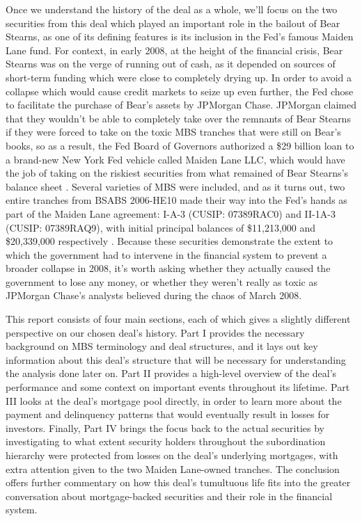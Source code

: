 \documentclass[12pt]{article}
\begin{document}
Once we understand the history of the deal as a whole, we’ll focus on the two securities from this deal which played an important role in the bailout of Bear Stearns, as one of its defining features is its inclusion in the Fed’s famous Maiden Lane fund. For context, in early 2008, at the height of the financial crisis, Bear Stearns was on the verge of running out of cash, as it depended on sources of short-term funding which were close to completely drying up. In order to avoid a collapse which would cause credit markets to seize up even further, the Fed chose to facilitate the purchase of Bear’s assets by JPMorgan Chase. JPMorgan claimed that they wouldn’t be able to completely take over the remnants of Bear Stearns if they were forced to take on the toxic MBS tranches that were still on Bear’s books, so as a result, the Fed Board of Governors authorized a \$29 billion loan to a brand-new New York Fed vehicle called Maiden Lane LLC, which would have the job of taking on the riskiest securities from what remained of Bear Stearns’s balance sheet \parencite{fcic09}. Several varieties of MBS were included, and as it turns out, two entire tranches from BSABS 2006-HE10 made their way into the Fed’s hands as part of the Maiden Lane agreement: I-A-3 (CUSIP: 07389RAC0) and II-1A-3 (CUSIP: 07389RAQ9), with initial principal balances of \$11,213,000 and \$20,339,000 respectively \parencite{fcic09}. Because these securities demonstrate the extent to which the government had to intervene in the financial system to prevent a broader collapse in 2008, it’s worth asking whether they actually caused the government to lose any money, or whether they weren’t really as toxic as JPMorgan Chase’s analysts believed during the chaos of March 2008.

This report consists of four main sections, each of which gives a slightly different perspective on our chosen deal’s history. Part I provides the necessary background on MBS terminology and deal structures, and it lays out key information about this deal’s structure that will be necessary for understanding the analysis done later on. Part II provides a high-level overview of the deal’s performance and some context on important events throughout its lifetime. Part III looks at the deal’s mortgage pool directly, in order to learn more about the payment and delinquency patterns that would eventually result in losses for investors. Finally, Part IV brings the focus back to the actual securities by investigating to what extent security holders throughout the subordination hierarchy were protected from losses on the deal’s underlying mortgages, with extra attention given to the two Maiden Lane-owned tranches. The conclusion offers further commentary on how this deal’s tumultuous life fits into the greater conversation about mortgage-backed securities and their role in the financial system.
\end{document}

